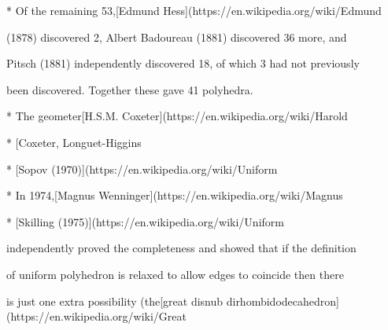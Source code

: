 * Of the remaining 53,[Edmund Hess](https://en.wikipedia.org/wiki/Edmund%

(1878) discovered 2, Albert Badoureau (1881) discovered 36 more, and

Pitsch (1881) independently discovered 18, of which 3 had not previously

been discovered. Together these gave 41 polyhedra.

* The geometer[H.S.M. Coxeter](https://en.wikipedia.org/wiki/Harold%

* [Coxeter, Longuet-Higgins %

* [Sopov (1970)](https://en.wikipedia.org/wiki/Uniform%

* In 1974,[Magnus Wenninger](https://en.wikipedia.org/wiki/Magnus%

* [Skilling (1975)](https://en.wikipedia.org/wiki/Uniform%

independently proved the completeness and showed that if the definition

of uniform polyhedron is relaxed to allow edges to coincide then there

is just one extra possibility (the[great disnub dirhombidodecahedron](https://en.wikipedia.org/wiki/Great%

